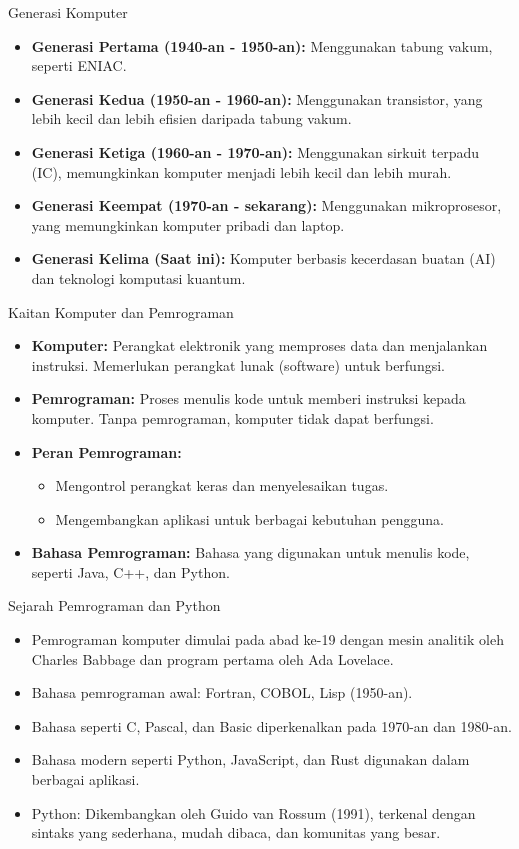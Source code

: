 \documentclass[aspectratio=169, table]{beamer}
\begin{document}
\begin{frame}{Generasi Komputer}
		\begin{itemize}
			\item \textbf{Generasi Pertama (1940-an - 1950-an):} Menggunakan tabung vakum, seperti ENIAC.
			\item \textbf{Generasi Kedua (1950-an - 1960-an):} Menggunakan transistor, yang lebih kecil dan lebih efisien daripada tabung vakum.
			\item \textbf{Generasi Ketiga (1960-an - 1970-an):} Menggunakan sirkuit terpadu (IC), memungkinkan komputer menjadi lebih kecil dan lebih murah.
			\item \textbf{Generasi Keempat (1970-an - sekarang):} Menggunakan mikroprosesor, yang memungkinkan komputer pribadi dan laptop.
			\item \textbf{Generasi Kelima (Saat ini):} Komputer berbasis kecerdasan buatan (AI) dan teknologi komputasi kuantum.
		\end{itemize}
\end{frame}

\begin{frame}{Kaitan Komputer dan Pemrograman}
	\begin{itemize}
		\item \textbf{Komputer:} Perangkat elektronik yang memproses data dan menjalankan instruksi. Memerlukan perangkat lunak (software) untuk berfungsi.
		\item \textbf{Pemrograman:} Proses menulis kode untuk memberi instruksi kepada komputer. Tanpa pemrograman, komputer tidak dapat berfungsi.
		\item \textbf{Peran Pemrograman:}
		\begin{itemize}
			\item Mengontrol perangkat keras dan menyelesaikan tugas.
			\item Mengembangkan aplikasi untuk berbagai kebutuhan pengguna.
		\end{itemize}
		\item \textbf{Bahasa Pemrograman:} Bahasa yang digunakan untuk menulis kode, seperti Java, C++, dan Python.
	\end{itemize}
\end{frame}


\begin{frame}[fragile]{Sejarah Pemrograman dan Python}
\begin{itemize}
\item Pemrograman komputer dimulai pada abad ke-19 dengan mesin analitik oleh Charles Babbage dan program pertama oleh Ada Lovelace.
\item Bahasa pemrograman awal: Fortran, COBOL, Lisp (1950-an).
\item Bahasa seperti C, Pascal, dan Basic diperkenalkan pada 1970-an dan 1980-an.
\item Bahasa modern seperti Python, JavaScript, dan Rust digunakan dalam berbagai aplikasi.
\item Python: Dikembangkan oleh Guido van Rossum (1991), terkenal dengan sintaks yang sederhana, mudah dibaca, dan komunitas yang besar.
\end{itemize}
\end{frame}
\end{document}
